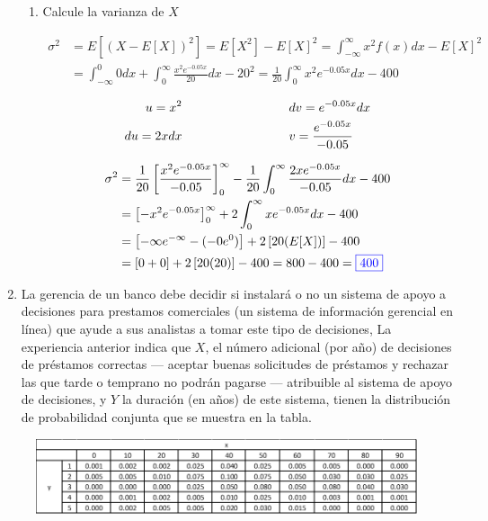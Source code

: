 \documentclass[12pt]{report}
\newcommand{\linejump}{\hfill \break}
\begin{document}
\begin{enumerate}
\begin{enumerate}[label=\alph*.]
    \item Calcule la varianza de $X$
    
    \begin{align*}
      \sigma^2 &= E\left[ \left( X - E[X] \right)^2 \right] = E[X^2] - E[X]^2 = \int_{-\infty}^{\infty} x^2 f(x)dx - E[X]^2 \\
      &= \int_{-\infty}^0 0dx + \int_0^{\infty} \frac{x^2e^{-0.05x}}{20} dx - 20^2 = \frac{1}{20} \int_0^{\infty} x^2e^{-0.05x} dx - 400
    \end{align*}

    \begin{align*}
      u = x^2 \hspace*{3cm} & dv = e^{-0.05x} dx \\
      du = 2xdx \hspace*{3cm} & v = \frac{e^{-0.05x}}{-0.05}
    \end{align*}

    \begin{align*}
      \sigma^2 &= \frac{1}{20} \left[ \frac{x^2e^{-0.05x}}{-0.05} \right]_0^{\infty} - \frac{1}{20} \int_0^{\infty} \frac{2xe^{-0.05x}}{-0.05} dx - 400 \\
      &= \left[ -x^2e^{-0.05x} \right]_0^\infty + 2\int_0^\infty xe^{-0.05x} dx - 400 \\
      &= \left[ -\infty e^{-\infty} - (-0e^0) \right] + 2\left[ 20(E[X]) \right] - 400 \\
      &= \left[ 0 + 0 \right] + 2\left[ 20(20) \right] - 400 = 800 - 400 = {\color{blue}\boxed{400}}
    \end{align*}

  \end{enumerate}

  \linejump
  \item La gerencia de un banco debe decidir si instalará o no un sistema de apoyo a decisiones para prestamos comerciales (un sistema de información gerencial en línea) que ayude a sus analistas a tomar este tipo de decisiones, La experiencia anterior indica que $X$, el número adicional (por año) de decisiones de préstamos correctas — aceptar buenas solicitudes de préstamos y rechazar las que tarde o temprano no podrán pagarse — atribuible al sistema de apoyo de decisiones, y $Y$ la duración (en años) de este sistema, tienen la distribución de probabilidad conjunta que se muestra en la tabla.
  \end{enumerate}

  \newpage
  \begin{figure}[h!]
    \centering
    \includegraphics[width=0.9\linewidth]{T1.png}
  \end{figure}
\end{document}
